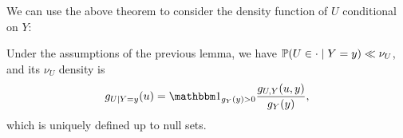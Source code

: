 We can use the above theorem to consider the density function of $U$ conditional on $Y$:
\begin{theorem}
	Under the assumptions of the previous lemma, we have $\mathbb P(U \in \cdot \mid Y = y) \ll \nu_U$, and its $\nu_U$ density is
	\[
	g_{U \mid Y = y}(u) = \ind_{g_Y(y) > 0}  \frac{g_{U, Y}(u, y)}{g_Y(y)},
	\]
	which is uniquely defined up to null sets. 
\end{theorem}